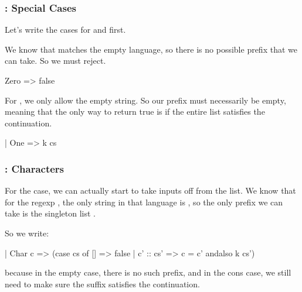 \documentclass[aspectratio=169, handout]{beamer}
\begin{document}
\begin{frame}[fragile]
  \frametitle{: Special Cases}

  Let's write the cases for  and  first.

  \pause
  \vspace{\fill}

  We know that  matches the empty language, so there is no possible
  prefix that we can take. So we must reject.

  \begin{codeblock}
    Zero => false
  \end{codeblock}

  \pause
  \vspace{\fill}

  For , we only allow the empty string. So our prefix must necessarily
  be empty, meaning that the only way to return true is if the entire list satisfies
  the continuation.

  \begin{codeblock}
    | One => k cs
  \end{codeblock}
\end{frame}

\begin{frame}[fragile]
  \frametitle{: Characters}

  For the  case, we can actually start to take inputs
  off from the list. We know that for the regexp , the only
  string in that language is , so the only prefix we can take is
  the singleton list .

  \pause
  \vspace{\fill}

  So we write:

  \begin{codeblock}
    | Char c => (case cs of
        [] => false
      | c' :: cs' => c = c' andalso k cs')
  \end{codeblock}

  because in the empty case, there is no such prefix, and in the cons case,
  we still need to make sure the suffix satisfies the continuation.
\end{frame}
\end{document}
